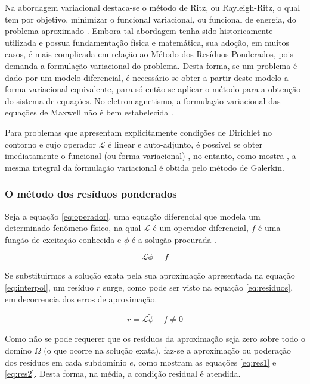 Na abordagem variacional destaca-se o método de Ritz, ou Rayleigh-Ritz, o qual tem por objetivo, minimizar o funcional variacional, ou funcional de energia, do problema aproximado \citep[p. 24]{volakis}. Embora tal abordagem tenha sido historicamente utilizada e possua fundamentação física e matemática, sua adoção, em muitos casos, é mais complicada em relação ao Método dos Resíduos Ponderados, pois demanda a formulação variacional do problema. Desta forma, se um problema é dado por um modelo diferencial, é necessário se obter a partir deste modelo a forma variacional equivalente, para só então se aplicar o método para a obtenção do sistema de equações. No eletromagnetismo, a formulação variacional das equações de Maxwell não é bem estabelecida \citep[p. 211]{jin}.

Para problemas que apresentam explicitamente condições de Dirichlet no contorno e cujo operador $\mathcal{L}$ é linear e auto-adjunto, é possível se obter imediatamente o funcional (ou forma variacional) \citep[p. 81]{zien}, no entanto, como mostra \citep[p. 29]{volakis}, a mesma integral da formulação variacional é obtida pelo método de Galerkin.

\subsubsection{O método dos resíduos ponderados}

Seja a equação \ref{eq:operador}, uma equação diferencial que modela um determinado fenômeno físico, na qual $\mathcal{L}$ é um operador diferencial, $f$ é uma função de excitação conhecida e $\phi$ é a solução procurada \citep[p. 20]{jin}\citep[p. 24]{volakis}.

 \begin{equation}
 	\label{eq:operador}
	\mathcal{L} \phi = f
 \end{equation}
 
 Se substituirmos a solução exata pela sua aproximação apresentada na equação \ref{eq:interpol}, um resíduo $r$ surge, como pode ser visto na equação \ref{eq:residuos}, em decorrencia dos erros de aproximação.
 
  \begin{equation}
  	\label{eq:residuos}
 	r = \mathcal{L} \tilde{\phi} - f \neq 0
  \end{equation}

Como não se pode requerer que os resíduos da aproximação seja zero sobre todo o domíno $\Omega$ (o que ocorre na solução exata), faz-se a aproximação ou poderação dos resíduos em cada subdomínio $e$, como mostram as equações \ref{eq:res1} e \ref{eq:res2}. Desta forma, na média, a condição residual é atendida. \citep[p. 28]{volakis}

